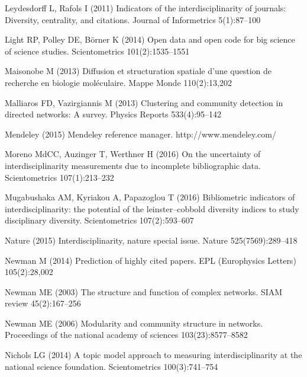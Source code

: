 \begin{thebibliography}{84}
Leydesdorff L, Rafols I (2011) Indicators of the interdisciplinarity of
  journals: Diversity, centrality, and citations. Journal of Informetrics
  5(1):87--100

Light RP, Polley DE, B{\"o}rner K (2014) Open data and open code for big
  science of science studies. Scientometrics 101(2):1535--1551

Maisonobe M (2013) Diffusion et structuration spatiale d'une question de
  recherche en biologie mol{\'e}culaire. Mappe Monde 110(2):13,202

Malliaros FD, Vazirgiannis M (2013) Clustering and community detection in
  directed networks: A survey. Physics Reports 533(4):95--142

Mendeley (2015) Mendeley reference manager. http://www.mendeley.com/

Moreno MdCC, Auzinger T, Werthner H (2016) On the uncertainty of
  interdisciplinarity measurements due to incomplete bibliographic data.
  Scientometrics 107(1):213--232

Mugabushaka AM, Kyriakou A, Papazoglou T (2016) Bibliometric indicators of
  interdisciplinarity: the potential of the leinster--cobbold diversity indices
  to study disciplinary diversity. Scientometrics 107(2):593--607

Nature (2015) Interdisciplinarity, nature special issue. Nature
  525(7569):289--418

Newman M (2014) Prediction of highly cited papers. EPL (Europhysics Letters)
  105(2):28,002

Newman ME (2003) The structure and function of complex networks. SIAM review
  45(2):167--256

Newman ME (2006) Modularity and community structure in networks. Proceedings of
  the national academy of sciences 103(23):8577--8582

Nichols LG (2014) A topic model approach to measuring interdisciplinarity at
  the national science foundation. Scientometrics 100(3):741--754


\end{thebibliography}
